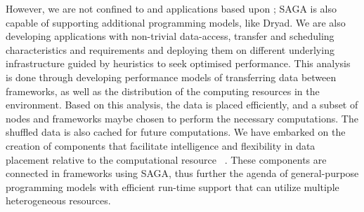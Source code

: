 \documentclass[3p,twocolumn]{elsarticle}
\begin{document}
However, we are not confined to \mr and applications based upon \mr;
SAGA is also capable of supporting additional programming models, like
Dryad.  We are also developing applications with non-trivial
data-access, transfer and scheduling characteristics and requirements
and deploying them on different underlying infrastructure guided by
heuristics to seek optimised performance.
This analysis is done through developing performance models of
transferring data between frameworks, as well as the distribution of
the computing resources in the environment. Based on this analysis,
the data is placed efficiently, and a subset of nodes and frameworks
maybe chosen to perform the necessary computations. The shuffled data
is also cached for future computations.  We have embarked on the
creation of components that facilitate intelligence and flexibility in
data placement relative to the computational resource
~\cite{saga_dic_royalsoc09}. These components are connected in
frameworks using SAGA, thus further the agenda of general-purpose
programming models with efficient run-time support that can utilize
multiple heterogeneous resources.




\end{document}
